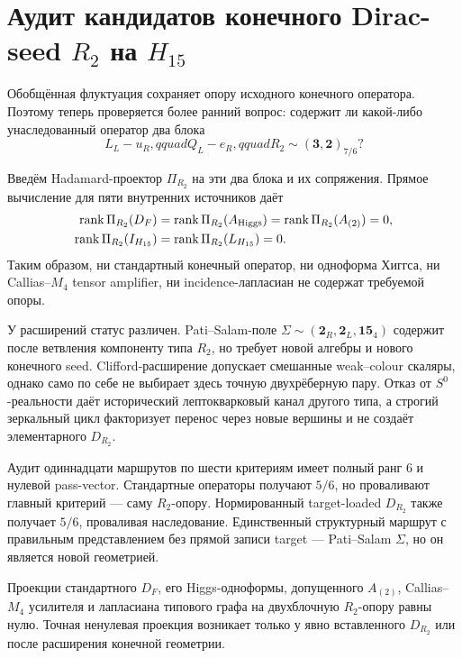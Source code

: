 \chapter{Аудит кандидатов конечного Dirac-seed
\texorpdfstring{$R_2$}{R2} на \texorpdfstring{$H_{15}$}{H15}}
\label{ch:v10-h15-r2-dirac-seed-audit}

Обобщённая флуктуация сохраняет опору исходного конечного оператора.
Поэтому теперь проверяется более ранний вопрос: содержит ли какой-либо
унаследованный оператор два блока
\begin{equation}
 L_L-u_R,qquad Q_L-e_R,qquad
 R_2\sim(\mathbf3,\mathbf2)_{7/6}?
\end{equation}

Введём Hadamard-проектор $\Pi_{R_2}$ на эти два блока и их сопряжения.
Прямое вычисление для пяти внутренних источников даёт
\begin{align}
 \operatorname{rank}\Pi_{R_2}(D_F)
 &=\operatorname{rank}\Pi_{R_2}(A_{\rm Higgs})
 =\operatorname{rank}\Pi_{R_2}(A_{(2)})=0,\nonumber\\
 \operatorname{rank}\Pi_{R_2}(I_{H_{15}})
 &=\operatorname{rank}\Pi_{R_2}(L_{H_{15}})=0.
\end{align}
Таким образом, ни стандартный конечный оператор, ни одноформа Хиггса, ни
Callias--$M_4$ tensor amplifier, ни incidence-лапласиан не содержат
требуемой опоры.

У расширений статус различен. Pati--Salam-поле
$\Sigma\sim(\mathbf2_R,\mathbf2_L,\mathbf{15}_4)$ содержит после ветвления
компоненту типа $R_2$, но требует новой алгебры и нового конечного seed.
Clifford-расширение допускает смешанные weak--colour скаляры, однако само
по себе не выбирает здесь точную двухрёберную пару. Отказ от
$S^0$-реальности даёт исторический лептокварковый канал другого типа, а
строгий зеркальный цикл факторизует перенос через новые вершины и не
создаёт элементарного $D_{R_2}$.

Аудит одиннадцати маршрутов по шести критериям имеет полный ранг $6$ и
нулевой pass-vector. Стандартные операторы получают $5/6$, но проваливают
главный критерий --- саму $R_2$-опору. Нормированный target-loaded
$D_{R_2}$ также получает $5/6$, проваливая наследование. Единственный
структурный маршрут с правильным представлением без прямой записи target ---
Pati--Salam $\Sigma$, но он является новой геометрией.

\begin{theorem}
Проекции стандартного $D_F$, его Higgs-одноформы, допущенного $A_{(2)}$,
Callias--$M_4$ усилителя и лапласиана типового графа на двухблочную
$R_2$-опору равны нулю. Точная ненулевая проекция возникает только у явно
вставленного $D_{R_2}$ или после расширения конечной геометрии.
\end{theorem}

